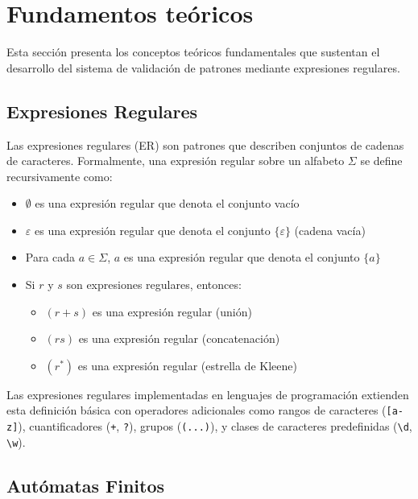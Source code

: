 \documentclass[10pt,letterpaper]{article}
\begin{document}
\section{Fundamentos teóricos}

Esta sección presenta los conceptos teóricos fundamentales que sustentan el desarrollo del sistema de validación de patrones mediante expresiones regulares.

\subsection{Expresiones Regulares}

Las expresiones regulares (ER) son patrones que describen conjuntos de cadenas de caracteres. Formalmente, una expresión regular sobre un alfabeto $\Sigma$ se define recursivamente como:

\begin{itemize}
    \item $\emptyset$ es una expresión regular que denota el conjunto vacío
    \item $\varepsilon$ es una expresión regular que denota el conjunto $\{\varepsilon\}$ (cadena vacía)
    \item Para cada $a \in \Sigma$, $a$ es una expresión regular que denota el conjunto $\{a\}$
    \item Si $r$ y $s$ son expresiones regulares, entonces:
    \begin{itemize}
        \item $(r + s)$ es una expresión regular (unión)
        \item $(rs)$ es una expresión regular (concatenación)
        \item $(r^*)$ es una expresión regular (estrella de Kleene)
    \end{itemize}
\end{itemize}

Las expresiones regulares implementadas en lenguajes de programación extienden esta definición básica con operadores adicionales como rangos de caracteres (\texttt{[a-z]}), cuantificadores (\texttt{+}, \texttt{?}), grupos (\texttt{(...)}), y clases de caracteres predefinidas (\texttt{\textbackslash d}, \texttt{\textbackslash w}).

\subsection{Autómatas Finitos}
\end{document}
